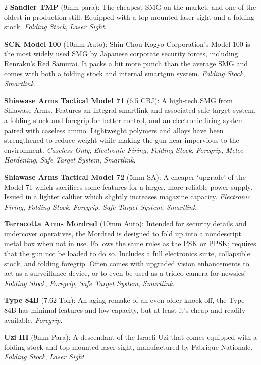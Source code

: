 \documentclass[
  oneside]{article}
\begin{document}
\begin{multicols}{2}
\textbf{Sandler TMP} (9mm para): The cheapest SMG
on the market, and one of the oldest in production
still. Equipped with a top-mounted laser sight and
a folding stock. \emph{Folding Stock}, \emph{Laser
Sight}.

\textbf{SCK Model 100} (10mm Auto): Shin Chou
Kogyo Corporation's Model 100 is the most widely
used SMG by Japanese corporate security forces,
including Renraku's Red Samurai. It packs a bit
more punch than the average SMG and comes with
both a folding stock and internal smartgun system.
\emph{Folding Stock}, \emph{Smartlink}.

\textbf{Shiawase Arms Tactical Model 71} (6.5
CBJ): A high-tech SMG from Shiawase Arms. Features
an integral smartlink and associated safe target
system, a folding stock and foregrip for better
control, and an electronic firing system paired
with caseless ammo. Lightweight polymers and
alloys have been strengthened to reduce weight
while making the gun near impervious to the
environment. \emph{Caseless Only},
\emph{Electronic Firing}, \emph{Folding Stock},
\emph{Foregrip}, \emph{Melee Hardening},
\emph{Safe Target System}, \emph{Smartlink}.

\textbf{Shiawase Arms Tactical Model 72} (5mm SA):
A cheaper `upgrade' of the Model 71 which
sacrifices some features for a larger, more
reliable power supply. Issued in a lighter caliber
which slightly increases magazine capacity.
\emph{Electronic Firing}, \emph{Folding Stock},
\emph{Foregrip}, \emph{Safe Target System},
\emph{Smartlink}.

\textbf{Terracotta Arms Mordred} (10mm Auto):
Intended for security details and undercover
operatives, the Mordred is designed to fold up
into a nondescript metal box when not in use.
Follows the same rules as the PSK or PPSK;
requires that the gun not be loaded to do so.
Includes a full electronics suite, collapsible
stock, and folding foregrip. Often comes with
upgraded vision enhancements to act as a
surveillance device, or to even be used as a
trideo camera for newsies! \emph{Folding Stock},
\emph{Foregrip}, \emph{Safe Target System},
\emph{Smartlink}.

\textbf{Type 84B} (7.62 Tok): An aging remake of
an even older knock off, the Type 84B has minimal
features and low capacity, but at least it's cheap
and readily available. \emph{Foregrip}.

\textbf{Uzi III} (9mm Para): A descendant of the
Israeli Uzi that comes equipped with a folding
stock and top-mounted laser sight, manufactured by
Fabrique Nationale. \emph{Folding Stock},
\emph{Laser Sight}.


\end{multicols}
\end{document}
